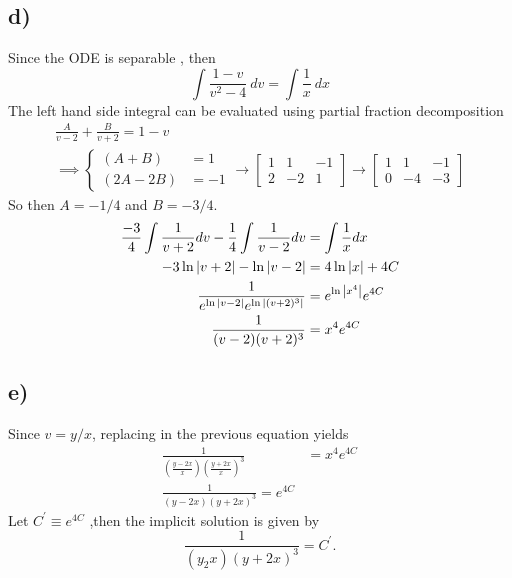 \documentclass[
	12pt,
	]{article}
\theoremstyle{definition}
\theoremstyle{definition}
\theoremstyle{definition}
\theoremstyle{definition}
\theoremstyle{definition}
\theoremstyle{example}
\theoremstyle{note}
\theoremstyle{remark}
\theoremstyle{example}
\begin{document}
			 \subsection{d) }
			 	Since the ODE is separable , then 
			 	$$ \int \frac{1-v}{v^{2}-4} \ dv = \int \frac{1}{x} \ dx$$
			 	The left hand side integral can be evaluated using partial fraction decomposition 
				\begin{gather*}
					\frac{A}{v-2} + \frac{B}{v+2} = 1-v\\
					\implies 
					\begin{cases}
						(A+B) &= 1 \\
						(2A - 2B) &= -1	
					\end{cases}
					\to 
					\begin{bmatrix}
						1 & 1 & -1 \\
						2 & -2 & 1 
					\end{bmatrix} 
					\to 
					\begin{bmatrix}
						1 & 1 & -1 \\
						0 & -4 & -3
					\end{bmatrix}
				\end{gather*}
				So then $A = -1/4$ and $B = -3/4$.
				\begin{align*}
					\frac{-3}{4} \int \frac{1}{v+2} dv - \frac{1}{4} \int \frac{1}{v-2} dv &= \int \frac{1}{x} dx \\
					-3\ln\abs{v+2} - \ln\abs{v-2} &= 4\ln\abs{x} + 4C \\
					\frac{1}{e^{\ln\abs{v-2}}e^{\ln\abs{(v+2)^{3}}}} &= e^{\ln\abs{x^{4}}}e^{4C}\\
					\frac{1}{(v-2)(v+2)^{3}}& = x^{4}e^{4C}
				\end{align*}
			\subsection{e) }
				Since $v = y/x$, replacing in the previous equation yields 
				\begin{align*}
					\frac{1}{\left(\frac{y-2x}{x}\right)\left(\frac{y+2x}{x}\right)^{3}} &= x^{4}e^{4C}\\
					\frac{1}{(y-2x)(y+2x)^{3}}=e^{4C}
				\end{align*} 
				Let $C^{\prime} \equiv e^{4C}$ ,then the implicit solution is given by 
				$$ \frac{1}{(y_2x)(y+2x)^{3}} = C^{\prime}.$$
\end{document}

